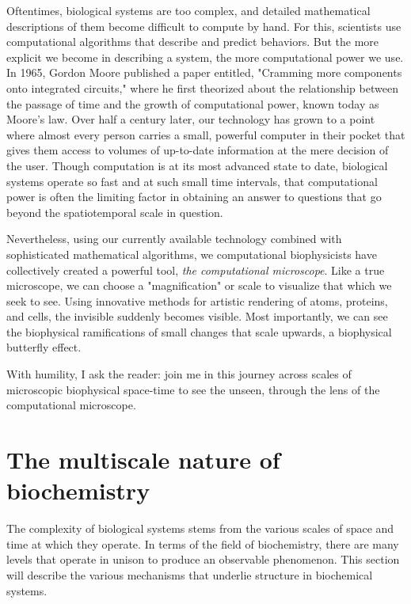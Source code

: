 \documentclass[12pt]{ucsddissertation}
\begin{document}
\begin{dissertationintroduction}
Oftentimes, biological systems are too complex, and detailed mathematical descriptions of them become difficult to compute by hand. For this, scientists use computational algorithms that describe and predict behaviors. But the more explicit we become in describing a system, the more computational power we use. In 1965, Gordon Moore published a paper entitled, "Cramming more components onto integrated circuits," \cite{Moore1965} where he first theorized about the relationship between the passage of time and the growth of computational power, known today as Moore's law. Over half a century later, our technology has grown to a point where almost every person carries a small, powerful computer in their pocket that gives them access to volumes of up-to-date information at the mere decision of the user. Though computation is at its most advanced state to date, biological systems operate so fast and at such small time intervals, that computational power is often the limiting factor in obtaining an answer to questions that go beyond the spatiotemporal scale in question.

Nevertheless, using our currently available technology combined with sophisticated mathematical algorithms, we computational biophysicists have collectively created a powerful tool, \textit{the computational microscope}. Like a true microscope, we can choose a "magnification" or scale to visualize that which we seek to see. Using innovative methods for artistic rendering of atoms, proteins, and cells, the invisible suddenly becomes visible. Most importantly, we can see the biophysical ramifications of small changes that scale upwards, a biophysical butterfly effect.

With humility, I ask the reader: join me in this journey across scales of microscopic biophysical space-time to see the unseen, through the lens of the computational microscope. 

\section{The multiscale nature of biochemistry}

The complexity of biological systems stems from the various scales of space and time at which they operate. In terms of the field of biochemistry, there are many levels that operate in unison to produce an observable phenomenon. This section will describe the various mechanisms that underlie structure in biochemical systems.


\end{dissertationintroduction}
\end{document}
